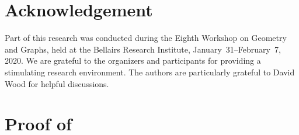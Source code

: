 \documentclass[kpfonts]{patmorin}
\begin{document}
\section*{Acknowledgement}

Part of this research was conducted during the Eighth Workshop on Geometry and Graphs, held at the Bellairs Research Institute, January~31--February~7, 2020.  We are grateful to the organizers and participants for providing a stimulating research environment.  The authors are particularly grateful to David Wood for helpful discussions.

  



\newpage
\appendix

\section{Proof of }
\end{document}
